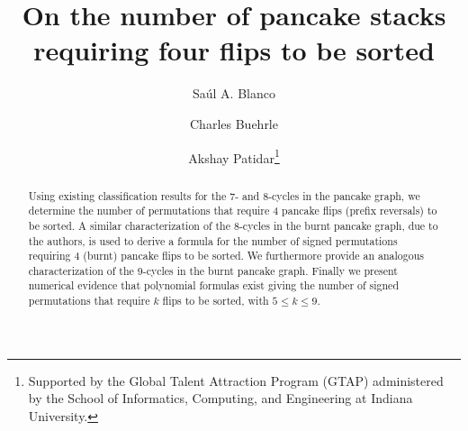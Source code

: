 \documentclass[final]{dmtcs-episciences}
\numberwithin{equation}{section}
\begin{document}
\author{Sa\'ul A. Blanco \and Charles Buehrle \and Akshay Patidar\thanks{Supported by the Global Talent Attraction Program (GTAP) administered by the School of Informatics, Computing, and Engineering at Indiana University.}}%

\title[Stacks requiring four flips to be sorted]{On the number of pancake stacks requiring four flips to be sorted}







\maketitle 
\begin{abstract}
    Using existing classification results for the 7- and 8-cycles in the pancake graph, we determine the number of permutations that require 4 pancake flips (prefix reversals) to be sorted.  A similar characterization of the 8-cycles in the burnt pancake graph, due to the authors, is used to derive a formula for the number of signed permutations requiring 4 (burnt) pancake flips to be sorted. We furthermore provide an analogous characterization of the 9-cycles in the burnt pancake graph. Finally we present numerical evidence that polynomial formulas exist giving the number of signed permutations that require $k$ flips to be sorted, with $5\leq k\leq9$. 
\end{abstract}
\end{document}
